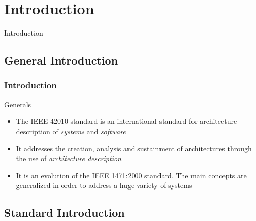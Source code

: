 \footnotesize

\section{Introduction}

	\begin{frame}
		\begin{center}
			\LARGE{Introduction}
		\end{center}
	\end{frame}

	\subsection{General Introduction}
		
		\begin{frame}
			\frametitle{Introduction}	
			\begin{block}{Generals}
				\begin{itemize}\vspace{0.3cm}
					\item The IEEE 42010 standard is an international standard for architecture description of \emph{systems} and \emph{software}\vspace{0.3cm}
					\item It addresses the creation, analysis and sustainment of architectures through the use of \emph{architecture description}\vspace{0.3cm}
					\item It is an evolution of the IEEE 1471:2000 standard. The main concepts are generalized in order to address a huge variety of systems\vspace{0.3cm}
				\end{itemize}
			\end{block}					
		\end{frame}
	
	\subsection{Standard Introduction}	
	
